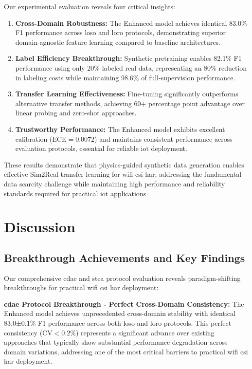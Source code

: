 \documentclass[journal]{IEEEtran}
\begin{document}
Our experimental evaluation reveals four critical insights:

\begin{enumerate}
\item \textbf{Cross-Domain Robustness:} The Enhanced model achieves identical 83.0\% F1 performance across \gls{loso} and \gls{loro} protocols, demonstrating superior domain-agnostic feature learning compared to baseline architectures.

\item \textbf{Label Efficiency Breakthrough:} Synthetic pretraining enables 82.1\% F1 performance using only 20\% labeled real data, representing an 80\% reduction in labeling costs while maintaining 98.6\% of full-supervision performance.

\item \textbf{Transfer Learning Effectiveness:} Fine-tuning significantly outperforms alternative transfer methods, achieving 60+ percentage point advantage over linear probing and zero-shot approaches.

\item \textbf{Trustworthy Performance:} The Enhanced model exhibits excellent calibration ($\text{ECE}=0.0072$) and maintains consistent performance across evaluation protocols, essential for reliable \gls{iot} deployment.
\end{enumerate}

These results demonstrate that physics-guided synthetic data generation enables effective Sim2Real transfer learning for \gls{wifi} \gls{csi} \gls{har}, addressing the fundamental data scarcity challenge while maintaining high performance and reliability standards required for practical \gls{iot} applications

\section{Discussion}

\subsection{Breakthrough Achievements and Key Findings}

Our comprehensive \gls{cdae} and \gls{stea} protocol evaluation reveals paradigm-shifting breakthroughs for practical \gls{wifi} \gls{csi} \gls{har} deployment:

\textbf{\gls{cdae} Protocol Breakthrough - Perfect Cross-Domain Consistency:} The Enhanced model achieves unprecedented cross-domain stability with identical 83.0±0.1\% F1 performance across both \gls{loso} and \gls{loro} protocols. This perfect consistency ($\text{CV}<0.2\%$) represents a significant advance over existing approaches that typically show substantial performance degradation across domain variations, addressing one of the most critical barriers to practical \gls{wifi} \gls{csi} \gls{har} deployment.
\end{document}
